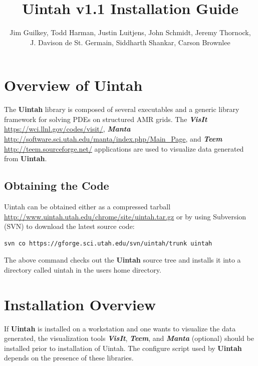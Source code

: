 \documentclass[12pt]{article}
\begin{document}
\title{Uintah v1.1 Installation Guide}

\author{Jim Guilkey, Todd Harman, Justin Luitjens, John Schmidt,
  Jeremy Thornock,\\
  J. Davison de St. Germain, Siddharth Shankar,
  Carson Brownlee}

\maketitle

\newpage

\tableofcontents

\newpage

\section{Overview of Uintah} \label{sec:overview}

The \textbf{Uintah} library is composed of several executables and a
generic library framework for solving PDEs on structured AMR grids.
The \textbf{\emph{VisIt}} \url{https://wci.llnl.gov/codes/visit/},
\textbf{\emph{Manta}}
\url{http://software.sci.utah.edu/manta/index.php/Main_Page}, and
\textbf{\emph{Teem}} \url{http://teem.sourceforge.net/} applications
are used to visualize data generated from \textbf{Uintah}.

\subsection{Obtaining the Code}
Uintah can be obtained either as a compressed tarball 
\url{http://www.uintah.utah.edu/chrome/site/uintah.tar.gz} or by
using Subversion (SVN) to download the latest source code:

\begin{verbatim}
svn co https://gforge.sci.utah.edu/svn/uintah/trunk uintah
\end{verbatim}

The above command checks out the \textbf{Uintah} source tree and
installs it into a directory called uintah in the users home
directory.


\section{Installation Overview}

If \textbf{Uintah} is installed on a workstation and one wants to
visualize the data generated, the visualization tools
\textbf{\emph{VisIt}}, \textbf{\emph{Teem}}, and \textbf{\emph{Manta}}
(optional) should be installed prior to installation of Uintah.  The
configure script used by \textbf{Uintah} depends on the presence of
these libraries.
\end{document}
